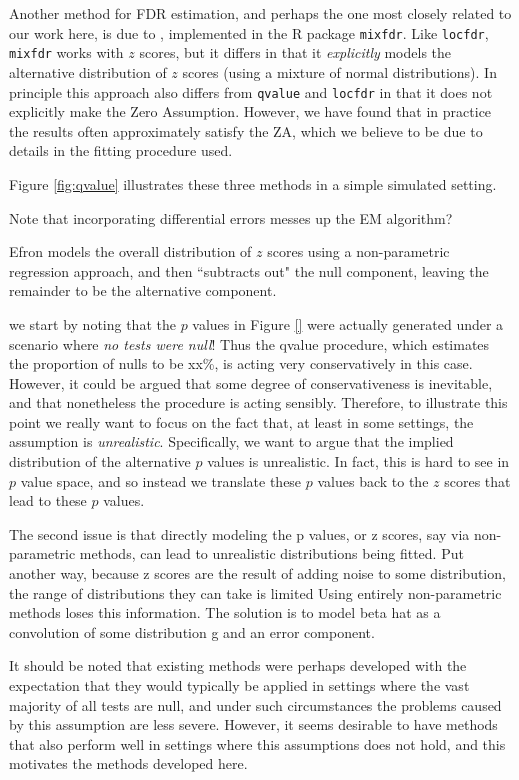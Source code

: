 \documentclass[11pt]{article}
\def\qvalue{{\tt qvalue}\xspace}
\def\locfdr{{\tt locfdr}\xspace}
\def\mixfdr{{\tt mixfdr}\xspace}
\begin{document}
Another method for FDR estimation, and perhaps the one most closely related to our
work here, is due to \cite{muralidharan.xx}, implemented in the R package \mixfdr.
Like \locfdr, \mixfdr works with $z$ scores, but it differs in that it {\it explicitly} models the alternative
distribution of $z$ scores (using a mixture of normal distributions). In principle this approach also differs from \qvalue and \locfdr in
that it does not explicitly make the Zero Assumption. However, we have found that in practice the results often approximately satisfy the ZA,
which we believe to be due to details in the fitting procedure used.

Figure \ref{fig:qvalue} illustrates these three methods in a simple simulated setting. 



Note that incorporating differential errors messes up the EM algorithm?

Efron models the overall distribution of $z$ scores using a non-parametric regression approach, and then ``subtracts out" the
null component, leaving the remainder to be the alternative component. 



we start by noting that the $p$ values in Figure \ref{} were actually generated under a scenario where
{\it no tests were null}! Thus the qvalue procedure, which estimates the proportion of nulls to be xx\%, is acting very conservatively in this case.
However, it could be argued that some degree of conservativeness is inevitable, and that nonetheless the procedure is acting sensibly.
Therefore, to illustrate this point we really want to focus on the fact that, at least in some settings, the assumption is {\it unrealistic}.
Specifically, we want to argue that the implied distribution of the alternative $p$ values is unrealistic. In fact, this is hard to see in $p$ value space,
and so instead we translate these $p$ values back to the $z$ scores that lead to these $p$ values.



The second issue is that directly modeling the p values, or z scores, say via non-parametric methods, 
can lead to unrealistic distributions being fitted. Put another way, because z scores are the result of adding noise to some
distribution, the range of distributions they can take is limited Using entirely non-parametric methods loses this information.
The solution is to model beta hat as a convolution of some distribution g and an error component.


It should be noted that existing methods were perhaps developed with the expectation that they would typically 
be applied in settings where the vast majority of all tests are null, and under such circumstances
the problems caused by this assumption are less severe. However, it seems desirable to have methods that
also perform well in settings where  this assumptions does not hold, and this motivates the methods developed here.
\end{document}
